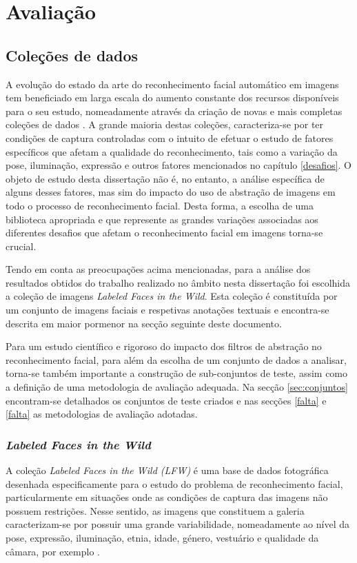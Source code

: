 \chapter{Avaliação} \label{chap:resultados}

\section{Coleções de dados} \label{sec:colecoes}

A evolução do estado da arte do reconhecimento facial automático em imagens tem beneficiado em larga escala do aumento constante dos recursos disponíveis para o seu estudo, nomeadamente através da criação de novas e mais completas coleções de dados \cite{Huang2007}. A grande maioria destas coleções, caracteriza-se por ter condições de captura controladas com o intuito de efetuar o estudo de fatores específicos que afetam a qualidade do reconhecimento, tais como a variação da pose, iluminação, expressão e outros fatores mencionados no capítulo \ref{desafios}. O objeto de estudo desta dissertação não é, no entanto, a análise específica de alguns desses fatores, mas sim do impacto do uso de abstração de imagens em todo o processo de reconhecimento facial. Desta forma, a escolha de uma biblioteca apropriada e que represente as grandes variações associadas aos diferentes desafios que afetam o reconhecimento facial em imagens torna-se crucial.

Tendo em conta as preocupações acima mencionadas, para a análise dos resultados obtidos do trabalho realizado no âmbito nesta dissertação foi escolhida a coleção de imagens \textit{Labeled Faces in the Wild}. Esta coleção é constituída por um conjunto de imagens faciais e respetivas anotações textuais e encontra-se descrita em maior pormenor na secção seguinte deste documento.

Para um estudo científico e rigoroso do impacto dos filtros de abstração no reconhecimento facial, para além da escolha de um conjunto de dados a analisar, torna-se também importante a construção de sub-conjuntos de teste, assim como a definição de uma metodologia de avaliação adequada. Na secção \ref{sec:conjuntos} encontram-se detalhados os conjuntos de teste criados e nas secções \ref{falta} e \ref{falta} as metodologias de avaliação adotadas.

\subsection{\textit{Labeled Faces in the Wild}}  \label{sec:lfw}
A coleção \textit{Labeled Faces in the Wild (LFW)} é uma base de dados fotográfica desenhada especificamente para o estudo do problema de reconhecimento facial, particularmente em situações onde as condições de captura das imagens não possuem restrições. Nesse sentido, as imagens que constituem a galeria caracterizam-se por possuir uma grande variabilidade, nomeadamente ao nível da pose, expressão, iluminação, etnia, idade, género, vestuário e qualidade da câmara, por exemplo \cite{Huang2007}.

